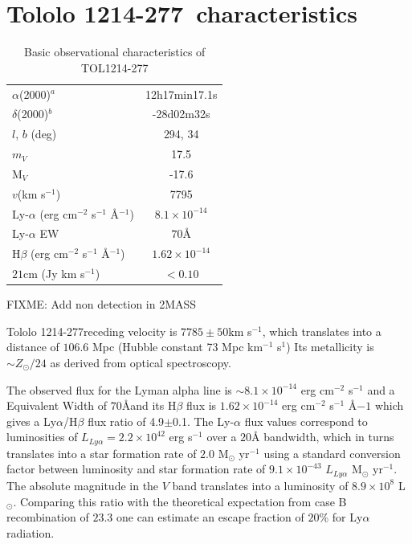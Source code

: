 \documentclass[a4paper, usenatbib, 12pt]{article}
\newcommand{\tol}{Tololo 1214-277}
\begin{document}
{{}


\newpage 

\section*{\tol\ characteristics}


\begin{table}
\begin{center}
\begin{tabular}{lc}
$\alpha$(2000)$^{a}$ & 12h17min17.1s\\
$\delta$(2000)$^{b}$ & -28d02m32s\\
$l$, $b$ (deg) & 294, 34\\
$m_V$ & 17.5\\
  M$_V$ & -17.6\\ 
$v$(km s$^{-1}$) & 7795\\
Ly-$\alpha$ (erg cm$^{-2}$ s$^{-1}$ \AA$^{-1}$)& $8.1\times 10^{-14}$ \\
Ly-$\alpha$ EW & $70$\AA\\
H$\beta$ (erg cm$^{-2}$ s$^{-1}$ \AA$^{-1}$) & $1.62\times 10^{-14}$ \\
$21$cm (Jy km s$^{-1}$)& $<0.10$ \\
\end{tabular}
\end{center}
\caption{Basic observational characteristics of TOL1214-277
  \cite{Thuan97}\\} 
\end{table}

FIXME: Add non detection in 2MASS %

\tol receding velocity is $7785\pm 50$km s$^{-1}$, which translates
into a distance of $106.6$ Mpc (Hubble constant 73 Mpc km$^{-1}$
s$^{1}$)
Its metallicity is $\sim Z_{\odot}/24$ \cite{Izotov04} as derived from optical
spectroscopy. 


The observed flux for the Lyman alpha line is $\sim
8.1\times 10^{-14}$ erg cm$^{-2}$ s$^{-1}$ \cite{Thuan97}
and a Equivalent Width of $70$\AA and its H$\beta$ flux is 
$1.62\times 10^{-14}$ erg cm$^{-2}$ s$^{-1}$ \AA${-1}$
\cite{Izotov04} which gives a Ly$\alpha$/H$\beta$ flux ratio of
4.9$\pm$0.1. The Ly-$\alpha$ flux values correspond to luminosities of
$L_{Ly\alpha}=2.2\times 10^{42}$ erg s$^{-1}$ over a $20$\AA
bandwidth, which in turns translates  into a star formation rate of
$2.0$ M$_{\odot}$ yr$^{-1}$ using a standard conversion factor between
luminosity and star formation rate of $9.1\times 10^{-43}$
$L_{Ly\alpha}$ M$_{\odot}$ yr$^{-1}$. 
The absolute magnitude in the $V$ band translates into a luminosity of
$8.9\times 10^{8}$ L$_{\odot}$.
Comparing this ratio with the theoretical expectation from case B
recombination of $23.3$ \cite{Hummer1987} one can estimate an escape
fraction of $20$\% for Ly$\alpha$ radiation.

}
\end{document}
